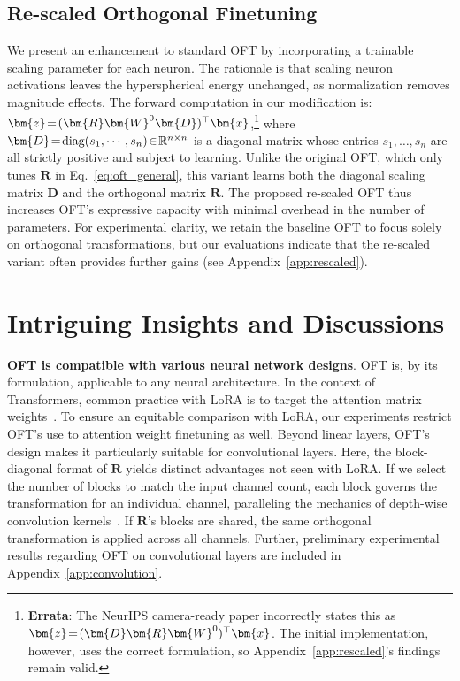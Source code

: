 \subsection{Re-scaled Orthogonal Finetuning}

We present an enhancement to standard OFT by incorporating a trainable scaling parameter for each neuron. The rationale is that scaling neuron activations leaves the hyperspherical energy unchanged, as normalization removes magnitude effects. The forward computation in our modification is: $\thickmuskip=2mu \medmuskip=2mu\bm{z}=(\bm{R}\bm{W}^0\bm{D})^\top\bm{x}$,\footnote{\textbf{Errata}: The NeurIPS camera-ready paper incorrectly states this as $\thickmuskip=2mu \medmuskip=2mu\bm{z}=(\bm{D}\bm{R}\bm{W}^0)^\top\bm{x}$. The initial implementation, however, uses the correct formulation, so Appendix~\ref{app:rescaled}'s findings remain valid.} where $\thickmuskip=2mu \medmuskip=2mu \bm{D} = \text{diag}(s_1,\cdots,s_n) \in \mathbb{R}^{n\times n}$ is a diagonal matrix whose entries $s_1,\ldots,s_n$ are all strictly positive and subject to learning. Unlike the original OFT, which only tunes $\bm{R}$ in Eq.~\eqref{eq:oft_general}, this variant learns both the diagonal scaling matrix $\bm{D}$ and the orthogonal matrix $\bm{R}$. The proposed re-scaled OFT thus increases OFT's expressive capacity with minimal overhead in the number of parameters. For experimental clarity, we retain the baseline OFT to focus solely on orthogonal transformations, but our evaluations indicate that the re-scaled variant often provides further gains (see Appendix~\ref{app:rescaled}).

\section{Intriguing Insights and Discussions}

\textbf{OFT is compatible with various neural network designs}. OFT is, by its formulation, applicable to any neural architecture. In the context of Transformers, common practice with LoRA is to target the attention matrix weights~\cite{hulora2022}. To ensure an equitable comparison with LoRA, our experiments restrict OFT's use to attention weight finetuning as well. Beyond linear layers, OFT's design makes it particularly suitable for convolutional layers. Here, the block-diagonal format of $\bm{R}$ yields distinct advantages not seen with LoRA. If we select the number of blocks to match the input channel count, each block governs the transformation for an individual channel, paralleling the mechanics of depth-wise convolution kernels~\cite{chollet2017xception}. If $\bm{R}$'s blocks are shared, the same orthogonal transformation is applied across all channels. Further, preliminary experimental results regarding OFT on convolutional layers are included in Appendix~\ref{app:convolution}.

